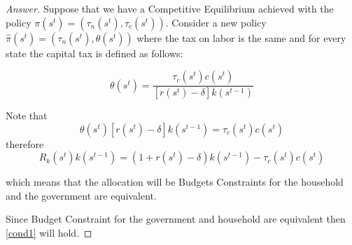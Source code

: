 \documentclass[12pt]{article}
\theoremstyle{definition}
\begin{document}
\begin{proof}[Answer]
Suppose that we have a Competitive Equilibrium achieved with the policy $\pi(s^t) = \left(\tau_n(s^t), \tau_c(s^t)\right)$. Consider a new policy $\hat{\pi}(s^t) = \left(\tau_n(s^t), \theta(s^t)\right)$ where the tax on labor is the same and for every state the capital tax is defined as follows:

$$\theta\left(s^{t}\right)=\frac{\tau_{c}(s^t) c\left(s^{t}\right)}{\left[r\left(s^{t}\right)-\delta\right] k(s^{t-1})}$$

Note that
$$ \theta(s^{t})[r(s^t)-\delta]k(s^{t-1}) = \tau_c(s^{t})c(s^{t})$$
therefore
$$R_k(s^t)k(s^{t-1}) = (1+r(s^t)-\delta)k(s^{t-1}) - \tau_c(s^{t})c(s^{t})$$

which means that the allocation will be Budgets Constraints for the household and the government are equivalent.

Since Budget Constraint for the government and household are equivalent then \eqref{cond1} will hold.

\end{proof}


\end{document}
